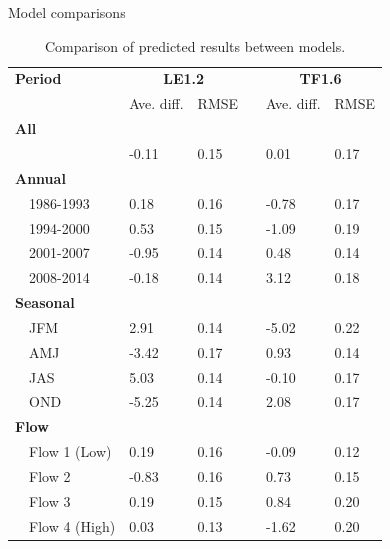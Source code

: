 \documentclass[serif]{beamer}\usepackage[]{graphicx}\usepackage[]{color}
\begin{document}
\begin{frame}{Model comparisons}
\scriptsize
\begin{table}[!tbp]
\caption{Comparison of predicted results between models.\label{tab:perfbtw}} 
\begin{center}
\begin{tabular}{lllcll}
\hline\hline
\multicolumn{1}{l}{\bfseries Period}&\multicolumn{2}{c}{\bfseries LE1.2}&\multicolumn{1}{c}{\bfseries }&\multicolumn{2}{c}{\bfseries TF1.6}\tabularnewline
\cline{2-3} \cline{5-6}
\multicolumn{1}{l}{}&\multicolumn{1}{c}{Ave. diff.}&\multicolumn{1}{c}{RMSE}&\multicolumn{1}{c}{}&\multicolumn{1}{c}{Ave. diff.}&\multicolumn{1}{c}{RMSE}\tabularnewline
\hline
{\bfseries All}&&&&&\tabularnewline
~~&-0.11&0.15&& 0.01&0.17\tabularnewline
\hline
{\bfseries Annual}&&&&&\tabularnewline
~~1986-1993& 0.18&0.16&&-0.78&0.17\tabularnewline
~~1994-2000& 0.53&0.15&&-1.09&0.19\tabularnewline
~~2001-2007&-0.95&0.14&& 0.48&0.14\tabularnewline
~~2008-2014&-0.18&0.14&& 3.12&0.18\tabularnewline
\hline
{\bfseries Seasonal}&&&&&\tabularnewline
~~JFM& 2.91&0.14&&-5.02&0.22\tabularnewline
~~AMJ&-3.42&0.17&& 0.93&0.14\tabularnewline
~~JAS& 5.03&0.14&&-0.10&0.17\tabularnewline
~~OND&-5.25&0.14&& 2.08&0.17\tabularnewline
\hline
{\bfseries Flow}&&&&&\tabularnewline
~~Flow 1 (Low)& 0.19&0.16&&-0.09&0.12\tabularnewline
~~Flow 2&-0.83&0.16&& 0.73&0.15\tabularnewline
~~Flow 3& 0.19&0.15&& 0.84&0.20\tabularnewline
~~Flow 4 (High)& 0.03&0.13&&-1.62&0.20\tabularnewline
\hline
\end{tabular}\end{center}

\end{table}

\end{frame}
\end{document}
